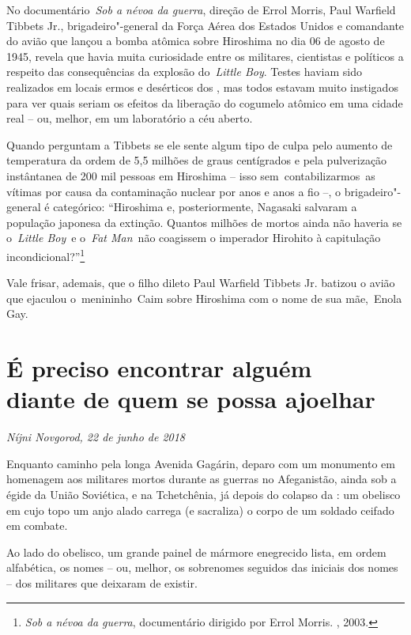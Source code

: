No documentário~\emph{Sob a névoa da guerra}, direção de Errol Morris,
Paul Warfield Tibbets Jr., brigadeiro"-general da Força Aérea dos Estados
Unidos e comandante do avião que lançou a bomba atômica sobre Hiroshima
no dia 06 de agosto de 1945, revela que havia muita curiosidade entre os
militares, cientistas e políticos a respeito das consequências da
explosão do~\emph{Little Boy}. Testes haviam sido realizados em locais
ermos e desérticos dos , mas todos estavam muito instigados para ver
quais seriam os efeitos da liberação do cogumelo atômico em uma cidade
real -- ou, melhor, em um laboratório a céu aberto.

Quando perguntam a Tibbets se ele sente algum tipo de culpa pelo aumento
de temperatura da ordem de 5,5 milhões de graus centígrados e pela
pulverização instântanea de 200 mil pessoas em Hiroshima -- isso
sem~contabilizarmos~as vítimas por causa da contaminação nuclear por
anos e anos a fio --, o brigadeiro"-general é categórico: ``Hiroshima e,
posteriormente, Nagasaki salvaram a população japonesa da extinção.
Quantos milhões de mortos ainda não haveria se o~\emph{Little Boy}~e
o~\emph{Fat Man}~não coagissem o imperador Hirohito à capitulação
incondicional?''\footnote{\emph{Sob a névoa da guerra}, documentário
  dirigido por Errol Morris. , 2003.}

Vale frisar, ademais, que o filho dileto Paul Warfield Tibbets Jr.
batizou o avião que ejaculou o~menininho~Caim sobre Hiroshima com o nome
de sua mãe,~Enola Gay.

\chapter*{É preciso encontrar alguém\\diante de quem se possa ajoelhar}

\begin{flushright}
\emph{Níjni Novgorod, 22 de junho de 2018}
\end{flushright}

Enquanto caminho pela longa Avenida Gagárin, deparo com um monumento em
homenagem aos militares mortos durante as guerras no Afeganistão, ainda
sob a égide da União Soviética, e na Tchetchênia, já depois do colapso
da : um obelisco em cujo topo um anjo alado carrega (e sacraliza) o
corpo de um soldado ceifado em combate.

Ao lado do obelisco, um grande painel de mármore enegrecido lista, em
ordem alfabética, os nomes -- ou, melhor, os sobrenomes seguidos das
iniciais dos nomes -- dos militares que deixaram de existir.


